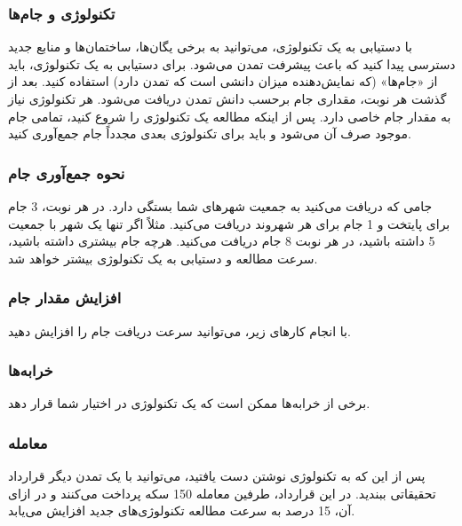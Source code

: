 \documentclass[]{article}
\begin{document}
\subsubsection*{{\titr تکنولوژی و جام‌ها}}
با دستیابی به یک تکنولوژی، می‌توانید به برخی یگان‌ها، ساختمان‌ها و منابع جدید دسترسی پیدا کنید که باعث پیشرفت تمدن می‌شود. برای دستیابی به یک تکنولوژی، باید از «جام‌ها» (که نمایش‌دهنده میزان دانشی است که تمدن دارد) استفاده کنید.
بعد از گذشت هر نوبت، مقداری جام برحسب دانش تمدن دریافت می‌شود. هر تکنولوژی نیاز به مقدار جام خاصی دارد. پس از اینکه مطالعه یک تکنولوژی را شروع کنید، تمامی جام موجود صرف آن می‌شود و باید برای تکنولوژی بعدی مجدداً جام جمع‌آوری کنید.

\subsubsection*{{\titr نحوه جمع‌آوری جام}}
جامی که دریافت می‌کنید به جمعیت شهرهای شما بستگی دارد. در هر نوبت، 3 جام برای پایتخت و 1 جام برای هر شهروند دریافت می‌کنید. مثلاً اگر تنها یک شهر با جمعیت 5 داشته باشید، در هر نوبت 8 جام دریافت می‌کنید. هرچه جام بیشتری داشته باشید، سرعت مطالعه و دستیابی به یک تکنولوژی بیشتر خواهد شد.

\subsubsection*{{\titr افزایش مقدار جام}}
 با انجام کارهای زیر، می‌توانید سرعت دریافت جام را افزایش دهید.

\subsubsection*{{\titr خرابه‌ها}}
برخی از خرابه‌ها ممکن است که یک تکنولوژی در اختیار شما قرار دهد.

\subsubsection*{{\titr معامله}}
پس از این که به تکنولوژی نوشتن دست یافتید، می‌توانید با یک تمدن دیگر قرارداد تحقیقاتی ببندید. در این قرارداد، طرفین معامله 150 سکه پرداخت می‌کنند و در ازای آن، 15 درصد به سرعت مطالعه تکنولوژی‌های جدید افزایش می‌یابد.
\end{document}
